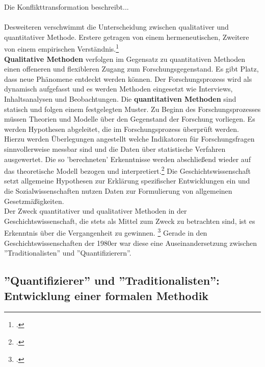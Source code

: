 \documentclass[12pt,a4paper]{article}
\begin{document}
Die  Konflikttransformation beschreibt...
\\
\\
Desweiteren verschwimmt die Unterscheidung zwischen qualitativer und quantitativer Methode. Erstere getragen von einem hermeneutischen, Zweitere von einem empirischen Verständnis.\footcite[][S.2-5]{sokollgrundlagen} 
\\
\textbf{Qualitative Methoden} verfolgen im Gegensatz zu quantitativen Methoden einen offeneren und flexibleren Zugang zum Forschungsgegenstand. Es gibt Platz, dass neue Phänomene entdeckt werden können. Der Forschungsprozess wird als dynamisch aufgefasst und es werden Methoden eingesetzt wie Interviews, Inhaltsanalysen und Beobachtungen. Die \textbf{quantitativen Methoden} sind statisch und folgen einem festgelegten Muster. Zu Beginn des Forschungsprozesses müssen Theorien und Modelle über den Gegenstand der Forschung vorliegen. Es werden Hypothesen abgeleitet, die im Forschungsprozess überprüft werden. Hierzu werden Überlegungen angestellt welche Indikatoren für Forschungsfragen sinnvollerweise messbar sind und die Daten über statistische Verfahren ausgewertet. Die so 'berechneten' Erkenntnisse werden abschließend wieder auf das theoretische Modell bezogen und interpretiert.\footcite[][S.309–329]{wolf1995qualitative} Die Geschichtswissenschaft setzt allgemeine Hypothesen zur Erklärung spezifischer Entwicklungen ein und die Sozialwissenschaften nutzen Daten zur Formulierung von allgemeinen Gesetzmäßigkeiten.
\\
Der Zweck quantitativer und qualitativer Methoden in der Geschichtswissenschaft, die stets als Mittel zum Zweck zu betrachten sind, ist es Erkenntnis über die Vergangenheit zu gewinnen. \footcite[][S.203-206]{jarausch1985quantitative} Gerade in den Geschichtswissenschaften der 1980er war diese eine Auseinandersetzung zwischen ''Traditionalisten'' und ''Quantifizierern''.

\newpage
\subsection{''Quantifizierer'' und ''Traditionalisten'': Entwicklung einer formalen Methodik }
\end{document}
